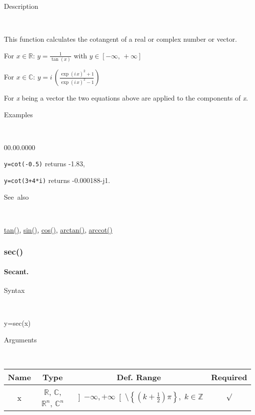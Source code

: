 \begin{description}
\item [Description]~
\end{description}
This function calculates the cotangent of a real or complex number
or vector.

\medskip{}
For $x\in\mathbb{R}$: $y={\displaystyle \frac{1}{\tan\left(x\right)}}$
with $y\in\left[-\infty,\,+\infty\right]$

\medskip{}
For $x\in\mathbb{C}$: $y=i\,{\displaystyle \left(\frac{\exp\left(i\, x\right)^{2}+1}{\exp\left(i\, x\right)^{2}-1}\right)}$
\medskip{}

\noindent For \textit{x} being a vector the two equations above are
applied to the components of \textit{x}.

\begin{description}
\item [Examples]~
\end{description}
\begin{lyxlist}{00.00.0000}
\item [\texttt{y=cot(-0.5)}]returns -1.83,
\item [\texttt{y=cot(3+4{*}i)}]returns -0.000188-j1.
\end{lyxlist}
\begin{description}
\item [See~also]~
\end{description}
\textcolor{blue}{\hyperlink{tan}{tan()}}\textcolor{black}{,} \textcolor{blue}{\hyperlink{sin}{sin()}}\textcolor{black}{,}
\textcolor{blue}{\hyperlink{cos}{cos()}}\textcolor{black}{,} \textcolor{blue}{\hyperlink{arctan}{arctan()}}\textcolor{black}{,}
\textcolor{blue}{\hyperlink{arccot}{arccot()}}


\newpage
\subsubsection*{\hypertarget{sec}{}{\Large sec()}}


\paragraph{\label{par:Secant}Secant.}

\begin{description}
\item [Syntax]~
\end{description}
y=sec(x)

\begin{description}
\item [Arguments]~
\end{description}
\begin{tabular}{|c|c|c|c|}
\hline 
Name&
Type&
Def. Range&
Required\tabularnewline
\hline
\hline 
x&
$\mathbb{R}$, $\mathbb{C}$, $\mathbb{R}^{n}$, $\mathbb{C}^{n}$&
$\left]-\infty,+\infty\right[\setminus\left\{ \left(k+\frac{1}{2}\right)\pi\right\} ,\; k\in\mathbb{Z}$&
$\surd$\tabularnewline
\hline
\end{tabular}

